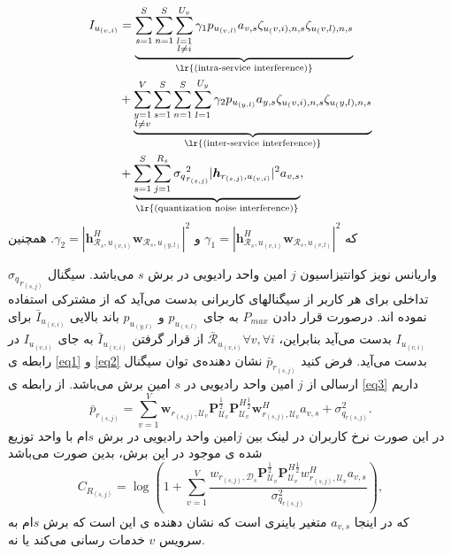 \begin{equation}
\begin{split}
 I_{u_{(v,i)}} &=
 \underbrace{\sum_{s=1}^{S}\sum_{n=1}^{S}\sum_{\substack{l=1 \\ l\neq i}}^{{U}_v} \gamma_{1}  p_{u_{(v,l)}}a_{v,s}\zeta_{u_(v,i),n,s}\zeta_{u_(v,l),n,s}}_{\text{\lr{(intra-service interference)}}}\\
&+ \underbrace{\sum_{\substack{y=1 \\ l\neq v}}^{V}\sum_{s=1}^{S}\sum_{n=1}^{S}\sum_{l=1}^{{U}_y} \gamma_{2}  p_{u_{(y,l)}}a_{y,s} \zeta_{u_(v,i),n,s}\zeta_{u_(y,l),n,s}}_{\text{\lr{(inter-service interference)}}}\\
&+\underbrace{ \sum_{s=1}^{S} \sum_{j=1}^{{R}_s} {\sigma_q}_{r_{(s,j)}}^2 |\boldsymbol{h}_{r_{(s,j)}, u_{(v,i)}}|^2 a_{v,s}}_{\text{\lr{(quantization noise interference)}}},
\end{split}
\end{equation}
که 
$\gamma_{1} =|\boldsymbol{h}_{\mathcal{R}_s, u_{(v,i)}}^H \boldsymbol{w}_{\mathcal{R}_{s},u_{(v,l)}}|^2$
و 
$\gamma_{2} =|\boldsymbol{h}_{\mathcal{R}_s, u_{(v,i)}}^H \boldsymbol{w}_{\mathcal{R}_{s},u_{(y,l)}}|^2$.
همچنین 

${\sigma_q}_{r_{(s,j)}}$
واریانس نویز کوانتیزاسیون
$j$
امین 
واحد رادیویی در برش $s$ می‌باشد.
سیگنال تداخلی برای هر کاربر از سیگنالهای کاربرانی بدست می‌آید که از  مشترکی استفاده نموده اند.
درصورت قرار دادن $P_{max}$
به جای 
$p_{u_{(v,l)}}$
و 
$p_{u_{(y,l)}}$
باند بالایی  
$\bar{I}_{u_{(v,i)}}$
برای 
$I_{u_{(v,i)}}$
بدست می‌آید
بنابراین،
$\bar{\mathcal{R}}_{u_{(v,i)}} \forall v , \forall i$ 
از قرار گرفتن 
$\bar{I}_{u_{(v,i)}}$
به جای 
$I_{u_{(v,i)}}$
در رابطه ی 
\eqref{eq1} و \eqref{eq2}
بدست می‌آید.
\newline
فرض کنید $\bar{p}_{r_{(s,j)}}$
نشان دهنده‌ی توان سیگنال ارسالی از $j$ امین واحد رادیویی در $s$ امین برش می‌باشد.
از رابطه ی \eqref{eq3} داریم
\begin{equation}
\bar{p}_{r_{(s,j)}} = \sum_{v=1}^{V}\boldsymbol{w}_{r_{(s,j)},\mathcal{U}_{v}} \boldsymbol{P}_{\mathcal{U}_v}^{\frac{1}{2}} \boldsymbol{P}_{\mathcal{U}_v}^{H \frac{1}{2}}   \boldsymbol{w}_{r_{(s,j)},\mathcal{U}_{v}}^H a_{v,s} + \sigma_{q_{r(s,j)}}^2.
\end{equation}
در این صورت نرخ کاربران در لینک  بین $j$امین واحد رادیویی در برش $s$ام با واحد توزیع شده ی موجود در این برش، بدین صورت می‌باشد  \cite{simeone2016cloud, 1111}
\begin{equation}
C_{R_{(s,j)}} = \log{(1+\sum_{v=1}^{V}\frac{w_{r_{(s,j)},\mathcal{D}_{s}} \boldsymbol{P}_{\mathcal{U}_v}^{\frac{1}{2}} \boldsymbol{P}_{\mathcal{U}_v}^{H \frac{1}{2}}   w_{r_{(s,j)},\mathcal{U}_{v}}^H a_{v,s}}{ \sigma_{q_{r(s,j)}}^2})},
\end{equation}
که در اینجا 
$a_{v,s}$
متغیر باینری است که نشان دهنده ی این است که برش $s$ام به سرویس $v$ خدمات رسانی می‌کند یا نه.

